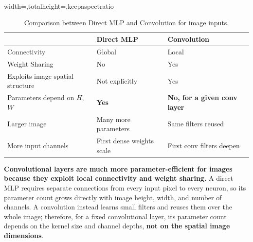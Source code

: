 \begin{table}[!htp]
    \centering
    \begin{adjustbox}{width={\textwidth},totalheight={\textheight},keepaspectratio}
        \begin{tabular}{@{} l l l @{}}
            \toprule
            & \textbf{Direct MLP} & \textbf{Convolution} \\
            \midrule
            Connectivity & Global & Local \\
            Weight Sharing & No & Yes \\
            Exploits image spatial structure & Not explicitly & Yes \\
            Parameters depend on $H$, $W$ & \textbf{Yes} & \textbf{No, for a given conv layer} \\
            Larger image & Many more parameters & Same filters reused \\
            More input channels & First dense weights scale & First conv filters deepen \\
            \bottomrule
        \end{tabular}
    \end{adjustbox}
    \caption{Comparison between Direct MLP and Convolution for image inputs.}
    \label{tab:cnn-vs-direct-mlp}
\end{table}

\begin{takeawaysbox}
    \textbf{Convolutional layers are much more parameter-efficient for images because they exploit local connectivity and weight sharing.} A direct MLP requires separate connections from every input pixel to every neuron, so its parameter count grows directly with image height, width, and number of channels. A convolution instead learns small filters and reuses them over the whole image; therefore, for a fixed convolutional layer, its parameter count depends on the kernel size and channel depths, \textbf{not on the spatial image dimensions}.
\end{takeawaysbox}
